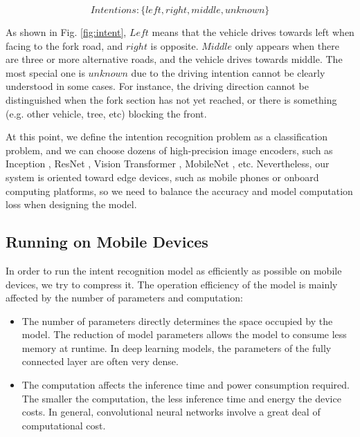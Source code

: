\documentclass[journal]{IEEEtran}
\begin{document}
    $$Intentions: \{ left, right, middle, unknown\}$$

As shown in Fig. \ref{fig:intent}, $Left$ means that the vehicle drives towards left when facing to the fork road, and $right$ is opposite. $Middle$ only appears when there are three or more alternative roads, and the vehicle drives towards middle. The most special one is $unknown$ due to the driving intention cannot be clearly understood in some cases. For instance, the driving direction cannot be distinguished when the fork section has not yet reached, or there is something (e.g. other vehicle, tree, etc) blocking the front.

At this point, we define the intention recognition problem as a classification problem, and we can choose dozens of high-precision image encoders, such as Inception \cite{inceptionv3}, ResNet \cite{he2016deep}, Vision Transformer \cite{vit}, MobileNet \cite{mobilenetv3}, etc.
Nevertheless, our system is oriented toward edge devices, such as mobile phones or onboard computing platforms, so we need to balance the accuracy and model computation loss when designing the model.


\subsection{Running on Mobile Devices}

In order to run the intent recognition model as efficiently as possible on mobile devices, we try to compress it. The operation efficiency of the model is mainly affected by the number of parameters and computation:
\begin{itemize}
    \item The number of parameters directly determines the space occupied by the model. The reduction of model parameters allows the model to consume less memory at runtime. In deep learning models, the parameters of the fully connected layer are often very dense.
    \item The computation affects the inference time and power consumption required. The smaller the computation, the less inference time and energy the device costs. In general, convolutional neural networks involve a great deal of computational cost.
\end{itemize}
\end{document}
